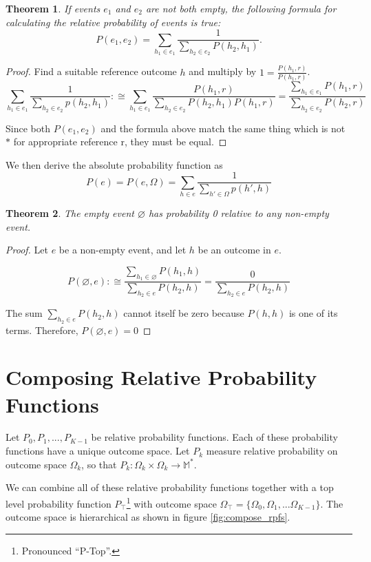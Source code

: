 \documentclass[twoside]{article}
\newcommand{\quotes}[1]{``#1''}
\theoremstyle{plain}%
\newtheorem{theorem}{Theorem}[section]
\theoremstyle{definition}
\theoremstyle{remark}
\begin{document}
\begin{theorem}
If events \(e_1\) and \(e_2\) are not both empty, the following formula for calculating the relative probability of events is true:
\[P(e_1, e_2) = \sum_{h_1 \in e_1} \frac{1}{\sum_{h_2 \in e_2} P(h_2, h_1)}.\]
\end{theorem}

\begin{proof}
Find a suitable reference outcome \(h\) and multiply by \(1 = \frac{P(h_1, r)}{P(h_1, r)}\).
\[\sum_{h_1 \in e_1} \frac{1}{\sum_{h_2 \in e_2} p(h_2, h_1)} :\cong \sum_{h_1 \in e_1} \frac{P(h_1, r)}{\sum_{h_2 \in e_2} P(h_2, h_1) P(h_1, r)} = \frac{\sum_{h_1 \in e_1} P(h_1, r)}{\sum_{h_2 \in e_2} P(h_2, r)}\]

Since both \(P(e_1, e_2)\) and the formula above match the same thing which is not \(\ast\) for appropriate reference r, they must be equal.
\end{proof}

We then derive the absolute probability function as
\[P(e) = P(e, \Omega) = \sum_{h \in e} \frac{1}{\sum_{h' \in \Omega}p(h', h)}\]

\begin{theorem}
\label{thm:empty_event_impossible}
The empty event \(\varnothing\) has probability 0 relative to any non-empty event.
\end{theorem}

\begin{proof}
Let \(e\) be a non-empty event, and let \(h\) be an outcome in \(e\).

\[P(\varnothing, e) :\cong \frac{\sum_{h_1 \in \varnothing} P(h_1, h)}{\sum_{h_2 \in e} P(h_2, h)} = \frac{0}{\sum_{h_2 \in e} P(h_2, h)}\]

The sum \(\sum_{h_2 \in e} P(h_2, h)\) cannot itself be zero because \(P(h, h)\) is one of its terms. Therefore, \(P(\varnothing, e) = 0\)
\end{proof}

\section{Composing Relative Probability Functions}

Let \(P_0, P_1, ..., P_{K-1}\) be relative probability functions. Each of these probability functions have a unique outcome space. Let \(P_k\) measure relative probability on outcome space \(\Omega_k\), so that \(P_k: \Omega_k \times \Omega_k \rightarrow \mathbb{M}^{\ast}\).

We can combine all of these relative probability functions together with a top level probability function \(P_\top\)\footnote{Pronounced \quotes{P-Top}.} with outcome space \(\Omega_\top = \{\Omega_0, \Omega_1, ... \Omega_{K- 1}\}\). The outcome space is hierarchical as shown in figure \ref{fig:compose_rpfs}.
\end{document}
